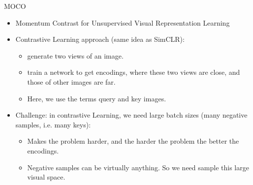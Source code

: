 \documentclass[xcolor=pdftex,dvipsnames,table]{beamer}
\begin{document}
\begin{frame}{MOCO}
\begin{itemize}
   \item Momentum Contrast for Unsupervised Visual Representation Learning\cite{He2020}
   \item Contrastive Learning approach (same idea as SimCLR): 
   \begin{itemize}
      \item generate two views of an image.
      \item train a network to get encodings, where these two views are close, and those of other images are far. 
      \item Here, we use the terms query and key images. 
   \end{itemize}
   \item Challenge: in contrastive Learning, we need large batch sizes (many negative samples, i.e. many keys): 
   \begin{itemize}
      \item Makes the problem harder, and the harder the problem the better the encodings.
      \item Negative samples can be virtually anything. So we need sample this large visual space. 
   \end{itemize}
\end{itemize}
\end{frame}
\end{document}
